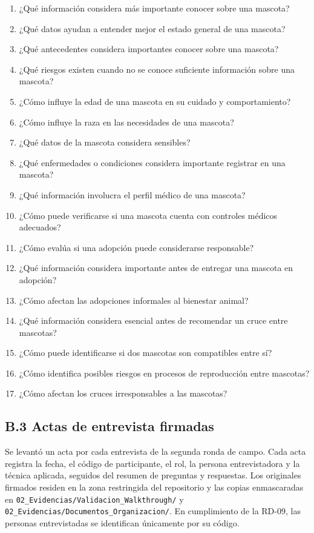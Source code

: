 \documentclass[journal,onecolumn]{IEEEtran}
\begin{document}
	\begin{enumerate}[leftmargin=*, itemsep=1pt]
		\item ¿Qué información considera más importante conocer sobre una mascota?
		\item ¿Qué datos ayudan a entender mejor el estado general de una mascota?
		\item ¿Qué antecedentes considera importantes conocer sobre una mascota?
		\item ¿Qué riesgos existen cuando no se conoce suficiente información sobre una mascota?
		\item ¿Cómo influye la edad de una mascota en su cuidado y comportamiento?
		\item ¿Cómo influye la raza en las necesidades de una mascota?
		\item ¿Qué datos de la mascota considera sensibles?
		\item ¿Qué enfermedades o condiciones considera importante registrar en una mascota?
		\item ¿Qué información involucra el perfil médico de una mascota?
		\item ¿Cómo puede verificarse si una mascota cuenta con controles médicos adecuados?
		\item ¿Cómo evalúa si una adopción puede considerarse responsable?
		\item ¿Qué información considera importante antes de entregar una mascota en adopción?
		\item ¿Cómo afectan las adopciones informales al bienestar animal?
		\item ¿Qué información considera esencial antes de recomendar un cruce entre mascotas?
		\item ¿Cómo puede identificarse si dos mascotas son compatibles entre sí?
		\item ¿Cómo identifica posibles riesgos en procesos de reproducción entre mascotas?
		\item ¿Cómo afectan los cruces irresponsables a las mascotas?
	\end{enumerate}
	
	
	\subsection*{B.3 Actas de entrevista firmadas}
	
	Se levantó un acta por cada entrevista de la segunda ronda de campo. Cada
	acta registra la fecha, el código de participante, el rol, la persona
	entrevistadora y la técnica aplicada, seguidos del resumen de preguntas y
	respuestas. Los originales firmados residen en la zona restringida del
	repositorio y las copias enmascaradas en
	\texttt{02\_Evidencias/Validacion\_Walkthrough/} y
	\texttt{02\_Evidencias/Documentos\_Organizacion/}. En cumplimiento de la
	RD-09, las personas entrevistadas se identifican únicamente por su código.
	
\end{document}
